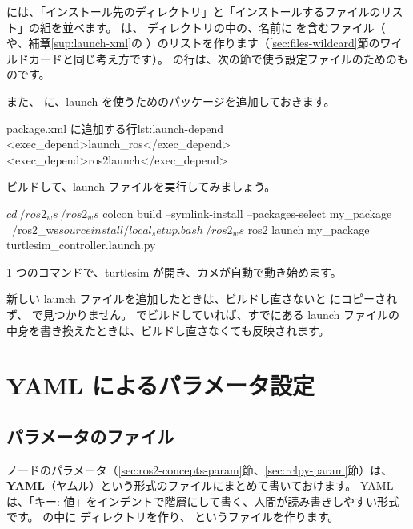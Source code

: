  には、「インストール先のディレクトリ」と「インストールするファイルのリスト」の組を並べます。
 は、 ディレクトリの中の、名前に  を含むファイル（ や、補章\ref{sup:launch-xml}の ）のリストを作ります（\ref{sec:files-wildcard}節のワイルドカードと同じ考え方です）。
 の行は、次の節で使う設定ファイルのためのものです。

また、 に、launch を使うためのパッケージを追加しておきます。

\begin{codelisting}[style=xml]{package.xml に追加する行}{lst:launch-depend}
  <exec_depend>launch_ros</exec_depend>
  <exec_depend>ros2launch</exec_depend>
\end{codelisting}

ビルドして、launch ファイルを実行してみましょう。

\begin{terminal}
$ cd ~/ros2_ws
~/ros2_ws$ colcon build --symlink-install --packages-select my_package
~/ros2_ws$ source install/local_setup.bash
~/ros2_ws$ ros2 launch my_package turtlesim_controller.launch.py
\end{terminal}

1 つのコマンドで、turtlesim が開き、カメが自動で動き始めます。

\begin{caution}
  新しい launch ファイルを追加したときは、ビルドし直さないと  にコピーされず、 で見つかりません。
   でビルドしていれば、すでにある launch ファイルの中身を書き換えたときは、ビルドし直さなくても反映されます。
\end{caution}

\section{YAML によるパラメータ設定}
\label{sec:launch-yaml}

\subsection{パラメータのファイル}

ノードのパラメータ（\ref{sec:ros2-concepts-param}節、\ref{sec:rclpy-param}節）は、\textbf{YAML}（ヤムル）という形式のファイルにまとめて書いておけます。
YAML は、「キー: 値」をインデントで階層にして書く、人間が読み書きしやすい形式です。
 の中に  ディレクトリを作り、 というファイルを作ります。

